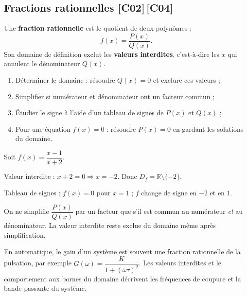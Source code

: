 \documentclass[a4paper,11pt]{article}
\begin{document}
\subsection{Fractions rationnelles \hfill {\normalsize\color{uimmred}[C02]\,[C04]}}

\begin{definition}
Une \textbf{fraction rationnelle} est le quotient de deux polynômes :
\[
f(x) = \frac{P(x)}{Q(x)}.
\]
Son domaine de définition exclut les \textbf{valeurs interdites}, c'est-à-dire les $x$ qui annulent le dénominateur $Q(x)$.
\end{definition}

\begin{methode}
\begin{enumerate}
  \item Déterminer le domaine : résoudre $Q(x) = 0$ et exclure ces valeurs ;
  \item Simplifier si numérateur et dénominateur ont un facteur commun ;
  \item Étudier le signe à l'aide d'un tableau de signes de $P(x)$ et $Q(x)$ ;
  \item Pour une équation $f(x) = 0$ : résoudre $P(x) = 0$ en gardant les solutions du domaine.
\end{enumerate}
\end{methode}

\begin{exemple}
Soit $f(x) = \dfrac{x - 1}{x + 2}$.

Valeur interdite : $x + 2 = 0 \Rightarrow x = -2$. Donc $D_f = \mathbb{R} \setminus \{-2\}$.

Tableau de signes : $f(x) = 0$ pour $x = 1$ ; $f$ change de signe en $-2$ et en $1$.
\end{exemple}

\begin{piege}
On ne simplifie $\dfrac{P(x)}{Q(x)}$ par un facteur que s'il est commun au numérateur \emph{et} au dénominateur. La valeur interdite reste exclue du domaine même après simplification.
\end{piege}

\begin{appliindus}
En automatique, le gain d'un système est souvent une fraction rationnelle de la pulsation, par exemple $G(\omega) = \dfrac{K}{1 + (\omega\tau)^2}$. Les valeurs interdites et le comportement aux bornes du domaine décrivent les fréquences de coupure et la bande passante du système.
\end{appliindus}
\end{document}
